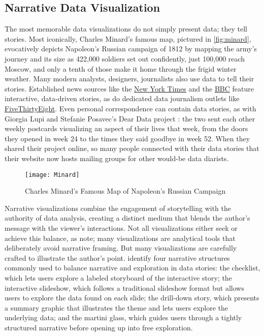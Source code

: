 \subsection{Narrative Data Visualization}\label{lit-review-narrative}
The most memorable data visualizations do not simply present data; they tell stories. Most iconically, Charles Minard's famous map, pictured in \autoref{fig:minard}, evocatively depicts Napoleon's Russian campaign of 1812 by mapping the army's journey and its size as 422,000 soldiers set out confidently, just 100,000 reach Moscow, and only a tenth of those make it home through the frigid winter weather. Many modern analysts, designers, journalists also use data to tell their stories. Established news sources like the \href{http://www.nytimes.com/interactive/2015/us/year-in-interactive-storytelling.html}{New York Times} and the \href{http://www.bbc.com/news/11628973}{BBC} feature interactive, data-driven stories, as do dedicated data journalism outlets like \href{http://fivethirtyeight.com/}{FiveThirtyEight}. Even personal correspondence can contain data stories, as with Giorgia Lupi and Stefanie Posavec's Dear Data project \citep{DearData}: the two sent each other weekly postcards visualizing an aspect of their lives that week, from the doors they opened in week 24 to the times they said goodbye in week 52. When they shared their project online, so many people connected with their data stories that their website now hosts mailing groups for other would-be data diarists.

\begin{figure}
  \texttt{[image: Minard]}
  \caption{Charles Minard's Famous Map of Napoleon's Russian Campaign}
  \label{fig:minard}
\end{figure}

Narrative visualizations combine the engagement of storytelling with the authority of data analysis, creating a distinct medium that blends the author's message with the viewer's interactions. Not all visualizations either seek or achieve this balance, as \citet{LeeEtAl2015More} note; many visualizations are analytical tools that deliberately avoid narrative framing. But many visualizations are carefully crafted to illustrate the author's point. \citet{SegelHeer2010Narrative} identify four narrative structures commonly used to balance narrative and exploration in data stories: the checklist, which lets users explore a labeled storyboard of the interactive story; the interactive slideshow, which follows a traditional slideshow format but allows users to explore the data found on each slide; the drill-down story, which presents a summary graphic that illustrates the theme and lets users explore the underlying data; and the martini glass, which guides users through a tightly structured narrative before opening up into free exploration.

